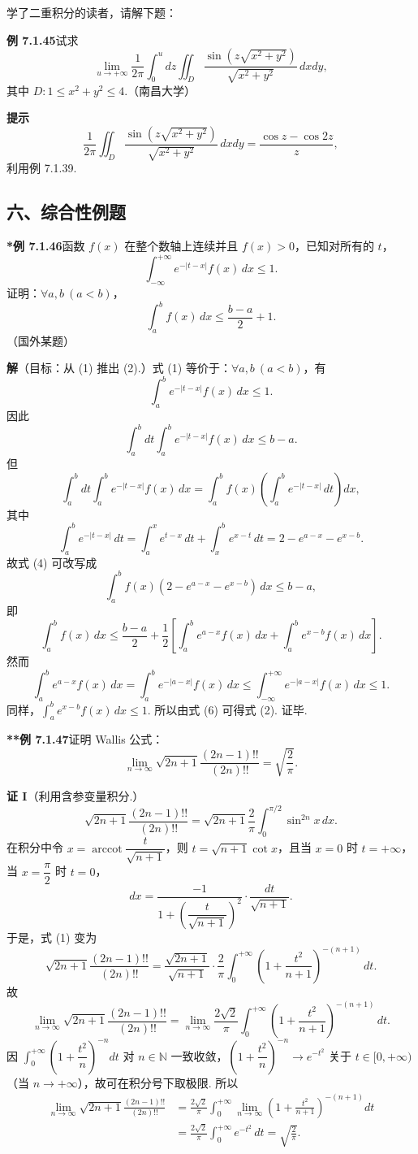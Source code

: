 \documentclass[UTF8, 12pt, fontset=fandol, oneside]{ctexart}
\begin{document}
学了二重积分的读者，请解下题：

\noindent\textbf{例 7.1.45}\quad 试求
\[
\lim_{u\to+\infty}\frac1{2\pi}\int_0^u dz\iint_D
\frac{\sin\left(z\sqrt{x^2+y^2}\right)}{\sqrt{x^2+y^2}}\,dxdy,
\]
其中 $D:1\le x^2+y^2\le4$.（南昌大学）

\noindent\textbf{提示}\quad
\[
\frac1{2\pi}\iint_D\frac{\sin\left(z\sqrt{x^2+y^2}\right)}{\sqrt{x^2+y^2}}\,dxdy
=\frac{\cos z-\cos2z}{z},
\]
利用例 7.1.39.

\subsection*{六、综合性例题}

\noindent\textbf{*例 7.1.46}\quad 函数 $f(x)$ 在整个数轴上连续并且 $f(x)>0$，已知对所有的 $t$，
\[
\int_{-\infty}^{+\infty}e^{-|t-x|}f(x)\,dx\le1.
\tag{1}
\]
证明：$\forall a,b\ (a<b)$，
\[
\int_a^bf(x)\,dx\le\frac{b-a}{2}+1.
\tag{2}
\]
（国外某题）

\noindent\textbf{解}\quad （目标：从 (1) 推出 (2).）式 (1) 等价于：$\forall a,b\ (a<b)$，有
\[
\int_a^be^{-|t-x|}f(x)\,dx\le1.
\tag{3}
\]
因此
\[
\int_a^b dt\int_a^be^{-|t-x|}f(x)\,dx\le b-a.
\tag{4}
\]
但
\[
\int_a^b dt\int_a^be^{-|t-x|}f(x)\,dx
=\int_a^bf(x)\left(\int_a^be^{-|t-x|}\,dt\right)dx,
\]
其中
\[
\int_a^be^{-|t-x|}\,dt
=\int_a^xe^{t-x}\,dt+\int_x^be^{x-t}\,dt=2-e^{a-x}-e^{x-b}.
\]
故式 (4) 可改写成
\[
\int_a^bf(x)(2-e^{a-x}-e^{x-b})\,dx\le b-a,
\tag{5}
\]
即
\[
\int_a^bf(x)\,dx\le\frac{b-a}{2}
+\frac12\left[\int_a^be^{a-x}f(x)\,dx+\int_a^be^{x-b}f(x)\,dx\right].
\tag{6}
\]
然而
\[
\int_a^be^{a-x}f(x)\,dx
=\int_a^be^{-|a-x|}f(x)\,dx
\le\int_{-\infty}^{+\infty}e^{-|a-x|}f(x)\,dx\le1.
\]
同样，$\displaystyle\int_a^be^{x-b}f(x)\,dx\le1$. 所以由式 (6) 可得式 (2). 证毕.

\noindent\textbf{**例 7.1.47}\quad 证明 Wallis 公式：
\[
\lim_{n\to\infty}\sqrt{2n+1}\frac{(2n-1)!!}{(2n)!!}=\sqrt{\frac2\pi}.
\]

\noindent\textbf{证 I}\quad （利用含参变量积分.）
\[
\sqrt{2n+1}\frac{(2n-1)!!}{(2n)!!}
=\sqrt{2n+1}\frac2\pi\int_0^{\pi/2}\sin^{2n}x\,dx.
\tag{1}
\]
在积分中令 $x=\operatorname{arccot}\dfrac{t}{\sqrt{n+1}}$，则 $t=\sqrt{n+1}\cot x$，且当 $x=0$ 时 $t=+\infty$，当 $x=\dfrac\pi2$ 时 $t=0$，
\[
dx=\frac{-1}{1+\left(\dfrac{t}{\sqrt{n+1}}\right)^2}\cdot\frac{dt}{\sqrt{n+1}}.
\]
于是，式 (1) 变为
\[
\sqrt{2n+1}\frac{(2n-1)!!}{(2n)!!}
=\frac{\sqrt{2n+1}}{\sqrt{n+1}}\cdot\frac2\pi
\int_0^{+\infty}\left(1+\frac{t^2}{n+1}\right)^{-(n+1)}\,dt.
\]
故
\[
\lim_{n\to\infty}\sqrt{2n+1}\frac{(2n-1)!!}{(2n)!!}
=\lim_{n\to\infty}\frac{2\sqrt2}{\pi}
\int_0^{+\infty}\left(1+\frac{t^2}{n+1}\right)^{-(n+1)}\,dt.
\]
因 $\displaystyle\int_0^{+\infty}\left(1+\dfrac{t^2}{n}\right)^{-n}dt$ 对 $n\in\mathbb N$ 一致收敛，$\left(1+\dfrac{t^2}{n}\right)^{-n}\to e^{-t^2}$ 关于 $t\in[0,+\infty)$（当 $n\to+\infty$），故可在积分号下取极限. 所以
\[
\begin{aligned}
\lim_{n\to\infty}\sqrt{2n+1}\frac{(2n-1)!!}{(2n)!!}
&=\frac{2\sqrt2}{\pi}\int_0^{+\infty}\lim_{n\to\infty}
\left(1+\frac{t^2}{n+1}\right)^{-(n+1)}dt\\
&=\frac{2\sqrt2}{\pi}\int_0^{+\infty}e^{-t^2}\,dt=\sqrt{\frac2\pi}.
\end{aligned}
\]
\end{document}
